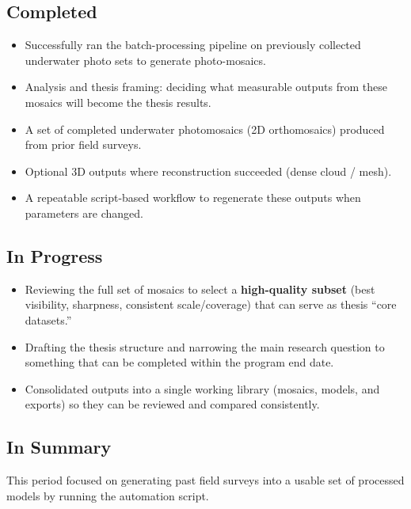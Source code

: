 \documentclass[a4paper,12pt]{article}
\begin{document}
\subsection{Completed}
\begin{itemize}
    \item Successfully ran the batch-processing pipeline on previously collected underwater photo sets to generate photo-mosaics.
 
    \item Analysis and thesis framing: deciding what measurable outputs from these mosaics will become the thesis results.
\end{itemize}

\begin{tcolorbox}[title=Current State of Data (What I Have Now)]
\begin{itemize}
    \item A set of completed underwater photomosaics (2D orthomosaics) produced from prior field surveys.
    \item Optional 3D outputs where reconstruction succeeded (dense cloud / mesh).
    \item A repeatable script-based workflow to regenerate these outputs when parameters are changed.
\end{itemize}
\end{tcolorbox}

\subsection{In Progress}
\begin{itemize}
    \item Reviewing the full set of mosaics to select a \textbf{high-quality subset} (best visibility, sharpness, consistent scale/coverage) that can serve as thesis ``core datasets.''
    \item Drafting the thesis structure and narrowing the main research question to something that can be completed within the program end date.
       \item Consolidated outputs into a single working library (mosaics, models, and exports) so they can be reviewed and compared consistently.
\end{itemize}


\subsection{In Summary}
This period focused on generating past field surveys into a usable set of processed models by running the automation script. 
\end{document}
